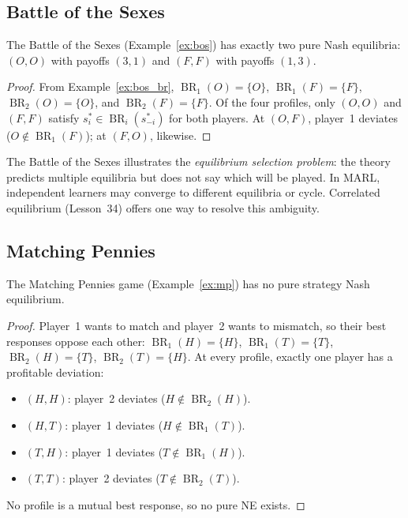 \documentclass[11pt,a4paper]{article}
\DeclareMathOperator{\BR}{BR}
\begin{document}
\subsection{Battle of the Sexes}
\label{subsec:bos_analysis}

\begin{proposition}
\label{prop:bos_ne}
The Battle of the Sexes (Example~\ref{ex:bos}) has exactly two pure Nash
equilibria: $(O, O)$ with payoffs $(3, 1)$ and $(F, F)$ with payoffs
$(1, 3)$.
\end{proposition}

\begin{proof}
From Example~\ref{ex:bos_br}, $\BR_1(O) = \{O\}$, $\BR_1(F) = \{F\}$,
$\BR_2(O) = \{O\}$, and $\BR_2(F) = \{F\}$.  Of the four profiles, only
$(O,O)$ and $(F,F)$ satisfy $s_i^* \in \BR_i(s_{-i}^*)$ for both players.
At $(O,F)$, player~1 deviates ($O \notin \BR_1(F)$); at $(F,O)$, likewise.
\end{proof}

\begin{remark}
The Battle of the Sexes illustrates the \emph{equilibrium selection
problem}: the theory predicts multiple equilibria but does not say which
will be played.  In MARL, independent learners may converge to different
equilibria or cycle.  Correlated equilibrium (Lesson~34) offers one way to
resolve this ambiguity.
\end{remark}

\subsection{Matching Pennies}
\label{subsec:mp_analysis}

\begin{proposition}
\label{prop:mp_no_pure}
The Matching Pennies game (Example~\ref{ex:mp}) has no pure strategy Nash
equilibrium.
\end{proposition}

\begin{proof}
Player~1 wants to match and player~2 wants to mismatch, so their best
responses oppose each other: $\BR_1(H) = \{H\}$, $\BR_1(T) = \{T\}$,
$\BR_2(H) = \{T\}$, $\BR_2(T) = \{H\}$.  At every profile, exactly one
player has a profitable deviation:
\begin{itemize}[nosep]
    \item $(H,H)$: player~2 deviates ($H \notin \BR_2(H)$).
    \item $(H,T)$: player~1 deviates ($H \notin \BR_1(T)$).
    \item $(T,H)$: player~1 deviates ($T \notin \BR_1(H)$).
    \item $(T,T)$: player~2 deviates ($T \notin \BR_2(T)$).
\end{itemize}
No profile is a mutual best response, so no pure NE exists.
\end{proof}
\end{document}

